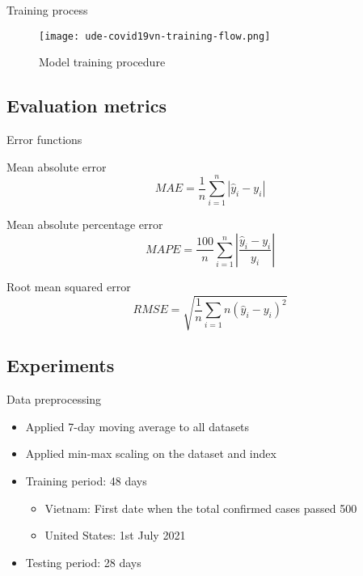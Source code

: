\begin{frame}{Training process}
    \begin{figure}[h]
        \centering
        \texttt{[image: ude-covid19vn-training-flow.png]}
        \caption[Training procedure]{Model training procedure}
        \label{fig:model-training-flow}
    \end{figure}
\end{frame}

\subsection{Evaluation metrics}

\begin{frame}{Error functions}
    \begin{block}{Mean absolute error}
        \begin{equation*}
            MAE = \frac{1}{n} \sum_{i=1}^n \left| \hat{y}_i - y_i \right|
        \end{equation*}
    \end{block}

    \begin{block}{Mean absolute percentage error}
        \begin{equation*}
            MAPE = \frac{100}{n} \sum_{i=1}^n \left| \frac{\hat{y}_i - y_i}{y_i} \right|
        \end{equation*}
    \end{block}

    \begin{block}{Root mean squared error}
        \begin{equation*}
            RMSE = \sqrt{\frac{1}{n} \sum_{i=1}{n} (\hat{y}_i - y_i)^2}
        \end{equation*}
    \end{block}
\end{frame}

\subsection{Experiments}

\begin{frame}{Data preprocessing}
    \begin{itemize}
        \item<1-> Applied 7-day moving average to all datasets
        \item<1-> Applied min-max scaling on the  dataset and  index
        \item<2-> Training period: 48 days
        \begin{itemize}
            \item Vietnam: First date when the total confirmed cases passed 500
            \item United States: 1st July 2021
        \end{itemize}
        \item<3-> Testing period: 28 days
    \end{itemize}
\end{frame}


